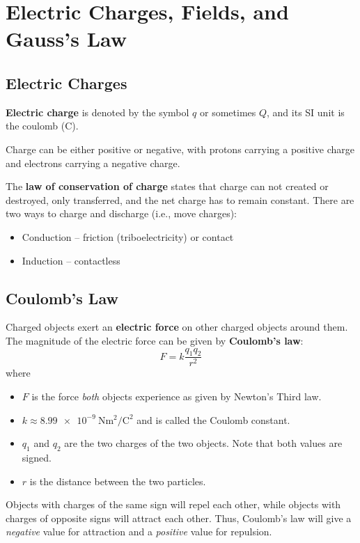 \documentclass[a4paper, titlepage]{book}
\begin{document}
\frontmatter


\tableofcontents


\mainmatter


\chapter{Electric Charges, Fields, and Gauss's Law}

\section{Electric Charges}

\textbf{Electric charge} is denoted by the symbol \(q\) or sometimes \(Q\),
and its SI unit is the coulomb (C).

Charge can be either positive or negative,
with protons carrying a positive charge and electrons carrying a negative charge.

The \textbf{law of conservation of  charge} states that charge can not created or destroyed,
only transferred,
and the net charge has to remain constant.
There are two ways to charge and discharge (i.e., move charges):
\begin{itemize}
    \item Conduction -- friction (triboelectricity) or contact
    \item Induction -- contactless
\end{itemize}

\section{Coulomb's Law}

Charged objects exert an \textbf{electric force} on other charged objects around them.
The magnitude of the electric force can be given by \textbf{Coulomb's law}:
\begin{equation}
    F = k\frac{q_1 q_2}{r^2}
\end{equation}
where
\begin{itemize}
    \item \(F\) is the force \emph{both} objects experience as given by Newton's Third law.
    \item \(k \approx \qty{8.99e-9}{\newton \meter\squared \per \coulomb\squared}\)
          and is called the Coulomb constant.
    \item \(q_1\) and \(q_2\) are the two charges of the two objects.
          Note that both values are signed.
    \item \(r\) is the distance between the two particles.
\end{itemize}
Objects with charges of the same sign will repel each other,
while objects with charges of opposite signs will attract each other.
Thus, Coulomb's law will give a \emph{negative} value for attraction
and a \emph{positive} value for repulsion.
\end{document}
